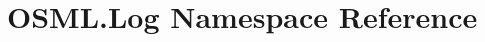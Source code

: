 \hypertarget{namespaceOSML_1_1Log}{}\section{O\+S\+M\+L.\+Log Namespace Reference}
\label{namespaceOSML_1_1Log}
